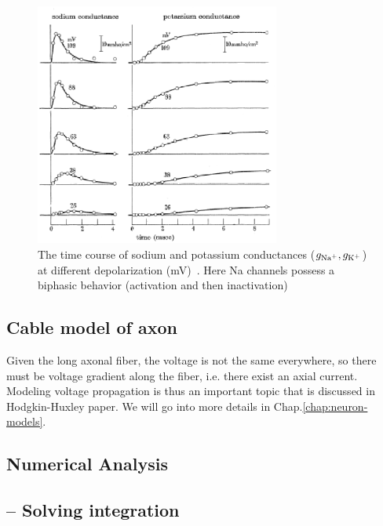 \begin{figure}[hbt]
  \centerline{\includegraphics[height=8cm]{./images/sodium-potassium_conductance.eps}}
  \caption{The time course of sodium and potassium conductances
    ($g_{\ce{Na+}}, g_{\ce{K+}}$) at different depolarization
    (mV)~\citep{hodgkin1958cli}. Here Na channels possess a biphasic
    behavior (activation and then inactivation)}
  \label{fig:Sodium-Potassium}
\end{figure}

\subsection{Cable model of axon}
\label{sec:cable-axon}

Given the long axonal fiber, the voltage is not the same everywhere, so there
must be voltage gradient along the fiber, i.e. there exist an axial current.
Modeling voltage propagation is thus an important topic that is discussed in
Hodgkin-Huxley paper. We will go into more details in
Chap.\ref{chap:neuron-models}.



\subsection{Numerical Analysis}
\label{sec:analysis-1}

\subsection{-- Solving integration}
\label{sec:solving-integration}

